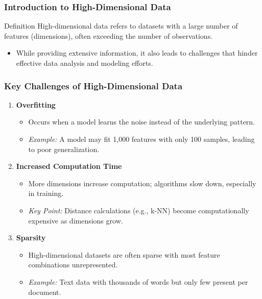 \documentclass[aspectratio=169]{beamer}
\begin{document}
\begin{frame}[fragile]
    \frametitle{Introduction to High-Dimensional Data}
    \begin{block}{Definition}
        High-dimensional data refers to datasets with a large number of features (dimensions), often exceeding the number of observations.
    \end{block}
    \begin{itemize}
        \item While providing extensive information, it also leads to challenges that hinder effective data analysis and modeling efforts.
    \end{itemize}
\end{frame}

\begin{frame}[fragile]
    \frametitle{Key Challenges of High-Dimensional Data}
    \begin{enumerate}
        \item \textbf{Overfitting}
            \begin{itemize}
                \item Occurs when a model learns the noise instead of the underlying pattern.
                \item \textit{Example:} A model may fit 1,000 features with only 100 samples, leading to poor generalization.
            \end{itemize}
        
        \item \textbf{Increased Computation Time}
            \begin{itemize}
                \item More dimensions increase computation; algorithms slow down, especially in training.
                \item \textit{Key Point:} Distance calculations (e.g., k-NN) become computationally expensive as dimensions grow.
            \end{itemize}
        
        \item \textbf{Sparsity}
            \begin{itemize}
                \item High-dimensional datasets are often sparse with most feature combinations unrepresented.
                \item \textit{Example:} Text data with thousands of words but only few present per document.
            \end{itemize}
    \end{enumerate}
\end{frame}
\end{document}
